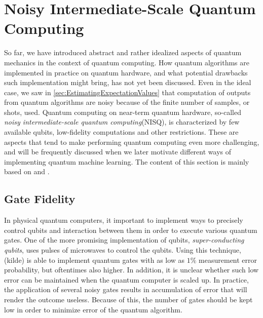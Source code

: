 \section{Noisy Intermediate-Scale Quantum Computing}\label{sec:Nisq}
So far, we have introduced abstract and rather idealized aspects of quantum mechanics in the context of quantum computing. How quantum algorithms are implemented in practice on quantum hardware, and what potential drawbacks such implementation might bring, has not yet been discussed. Even in the ideal case, we saw in \autoref{sec:EstimatingExpectationValues} that computation of outputs from quantum algorithms are noisy because of the finite number of samples, or shots, used. Quantum computing on near-term quantum hardware, so-called \emph{noisy intermediate-scale quantum computing}(NISQ)\cite{Preskill_2018}, is characterized by few available qubits, low-fidelity computations and other restrictions. These are aspects that tend to make performing quantum computing even more challenging, and will be frequently discussed when we later motivate different ways of implementing quantum machine learning. The content of this section is mainly based on \cite{SupervisedwquantumComputers} and \cite{Preskill_2018}.


\subsection{Gate Fidelity}\label{sec:GateFidelity}
In physical quantum computers, it important to implement ways to precisely control qubits and interaction between them in order to execute various quantum gates. One of the more promising implementation of qubits, \emph{super-conducting qubits}, uses pulses of microwaves to control the qubits. Using this technique, (kilde) is able to implement quantum gates with as low as $1\%$ measurement error probability, but oftentimes also higher. In addition, it is unclear whether such low error can be maintained when the quantum computer is scaled up. In practice, the application of several noisy gates results in accumulation of error that will render the outcome useless. Because of this, the number of gates should be kept low in order to minimize error of the quantum algorithm. 

